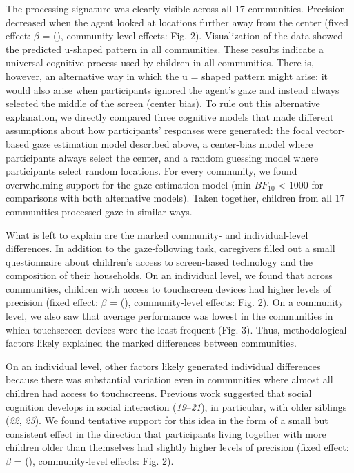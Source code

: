 \documentclass[
  man,floatsintext]{apa6}
\begin{document}
The processing signature was clearly visible across all 17 communities. Precision decreased when the agent looked at locations further away from the center (fixed effect: \(\beta\) = (), community-level effects: Fig. 2). Visualization of the data showed the predicted u-shaped pattern in all communities. These results indicate a universal cognitive process used by children in all communities. There is, however, an alternative way in which the u = shaped pattern might arise: it would also arise when participants ignored the agent's gaze and instead always selected the middle of the screen (center bias). To rule out this alternative explanation, we directly compared three cognitive models that made different assumptions about how participants' responses were generated: the focal vector-based gaze estimation model described above, a center-bias model where participants always select the center, and a random guessing model where participants select random locations. For every community, we found overwhelming support for the gaze estimation model (min \(BF_{10}\) \textless{} 1000 for comparisons with both alternative models). Taken together, children from all 17 communities processed gaze in similar ways.

What is left to explain are the marked community- and individual-level differences. In addition to the gaze-following task, caregivers filled out a small questionnaire about children's access to screen-based technology and the composition of their households. On an individual level, we found that across communities, children with access to touchscreen devices had higher levels of precision (fixed effect: \(\beta\) = (), community-level effects: Fig. 2). On a community level, we also saw that average performance was lowest in the communities in which touchscreen devices were the least frequent (Fig. 3). Thus, methodological factors likely explained the marked differences between communities.

On an individual level, other factors likely generated individual differences because there was substantial variation even in communities where almost all children had access to touchscreens. Previous work suggested that social cognition develops in social interaction (\emph{19}--\emph{21}), in particular, with older siblings (\emph{22}, \emph{23}). We found tentative support for this idea in the form of a small but consistent effect in the direction that participants living together with more children older than themselves had slightly higher levels of precision (fixed effect: \(\beta\) = (), community-level effects: Fig. 2).
\end{document}

